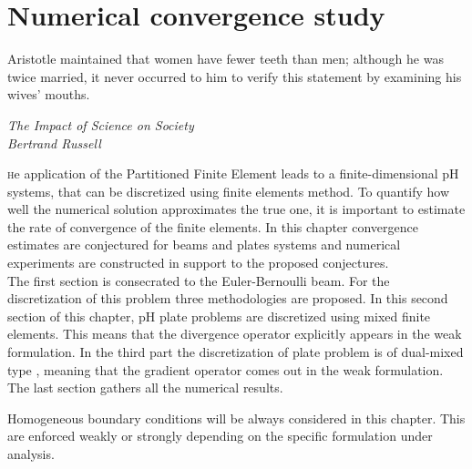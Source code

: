 \chapter{Numerical convergence study}\label{ch:conv}

\epigraph{Aristotle maintained that women have fewer teeth than men; although he was twice married, it never occurred to him to verify this statement by examining his wives' mouths.}{\textit{The Impact of Science on Society \\ Bertrand Russell}}

\minitoc

\lettrine{\color{theme}{T}}he application of the Partitioned Finite Element leads to a finite-dimensional pH systems, that can be discretized using finite elements method. To quantify how well the numerical solution approximates the true one, it is important to estimate the rate of convergence of the finite elements. In this chapter convergence estimates are conjectured for beams and plates systems and numerical experiments are constructed in support to the proposed conjectures. \\

The first section is consecrated to the Euler-Bernoulli beam. For the discretization of this problem three methodologies are proposed. In this second section of this chapter, pH plate problems are discretized using mixed finite elements. This means that the divergence operator explicitly appears in the weak formulation.  In the third part the discretization of plate problem is of dual-mixed type \cite{arnold1990intro}, meaning that the gradient operator comes out in the weak formulation. The last section gathers all the numerical results. \\

\begin{remark}
Homogeneous boundary conditions will be always considered in this chapter. This are enforced weakly or strongly depending on the specific formulation under analysis.
\end{remark}


